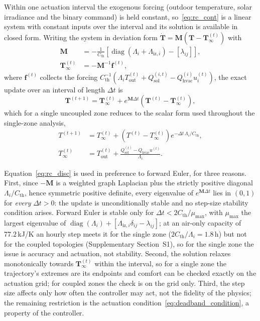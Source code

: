 \documentclass[3p,twocolumn,number]{elsarticle}
\newcommand{\Tout}{T_{\mathrm{out}}}
\newcommand{\Cth}{C_{\mathrm{th}}}
\newcommand{\lij}{\lambda_{ij}}
\newcommand{\Qhvac}{Q_{\mathrm{hvac}}}
\newcommand{\Liz}[1]{\Lambda_{\mathrm{iz},#1}}
\begin{document}
Within one actuation interval the exogenous forcing (outdoor temperature, solar irradiance and the binary command) is held constant, so~\eqref{eq:rc_cont} is a linear system with constant inputs over the interval and its solution is available in closed form. Writing the system in deviation form $\dot{\mathbf{T}}=\mathbf{M}\!\left(\mathbf{T}-\mathbf{T}_\infty^{(t)}\right)$ with
\begin{equation}
\begin{aligned}
  \mathbf{M}&=-\tfrac{1}{\Cth}\!\left[\operatorname{diag}\!\left(\Lambda_i+\Liz{i}\right)-\left[\lij\right]\right],\\
  \mathbf{T}_\infty^{(t)}&=-\mathbf{M}^{-1}\mathbf{f}^{(t)},
\end{aligned}
  \label{eq:rc_matrix}
\end{equation}
where $\mathbf{f}^{(t)}$ collects the forcing $\Cth^{-1}\!\left(\Lambda_i\Tout^{(t)}+Q_{\mathrm{sol}}^{(i,t)}-\Qhvac^{(i)}u_i^{(t)}\right)$, the exact update over an interval of length $\Delta t$ is
\begin{equation}
  \mathbf{T}^{(t+1)}
  =\mathbf{T}_\infty^{(t)}
  +e^{\mathbf{M}\Delta t}\!\left(\mathbf{T}^{(t)}-\mathbf{T}_\infty^{(t)}\right),
  \label{eq:rc_disc}
\end{equation}
which for a single uncoupled zone reduces to the scalar form used throughout the single-zone analysis,
\begin{equation}
\begin{aligned}
  T^{(t+1)}&=T_\infty^{(t)}+\left(T^{(t)}-T_\infty^{(t)}\right)e^{-\Delta t\,\Lambda_i/\Cth},\\
  T_\infty^{(t)}&=\Tout^{(t)}+\frac{Q_{\mathrm{sol}}^{(t)}-\Qhvac u^{(t)}}{\Lambda_i}.
\end{aligned}
  \label{eq:rc_scalar}
\end{equation}

Equation~\eqref{eq:rc_disc} is used in preference to forward Euler, for three reasons. First, since $-\mathbf{M}$ is a weighted graph Laplacian plus the strictly positive diagonal $\Lambda_i/\Cth$, hence symmetric positive definite, every eigenvalue of $e^{\mathbf{M}\Delta t}$ lies in $(0,1)$ for \emph{every} $\Delta t>0$: the update is unconditionally stable and no step-size stability condition arises. Forward Euler is stable only for $\Delta t<2\Cth/\mu_{\max}$, with $\mu_{\max}$ the largest eigenvalue of $\operatorname{diag}(\Lambda_i)+[\Liz{i}\delta_{ij}-\lij]$; at an air-only capacity of $77.2\,$kJ/K an hourly step meets it for the single zone ($2\Cth/\Lambda_i=1.8\,$h) but not for the coupled topologies (Supplementary Section~S1), so for the single zone the issue is accuracy and actuation, not stability. Second, the solution relaxes monotonically towards $\mathbf{T}_\infty^{(t)}$ within the interval, so for a single zone the trajectory's extremes are its endpoints and comfort can be checked exactly on the actuation grid; for coupled zones the check is on the grid only. Third, the step size affects only how often the controller may act, not the fidelity of the physics; the remaining restriction is the actuation condition~\eqref{eq:deadband_condition}, a property of the controller.
\end{document}
